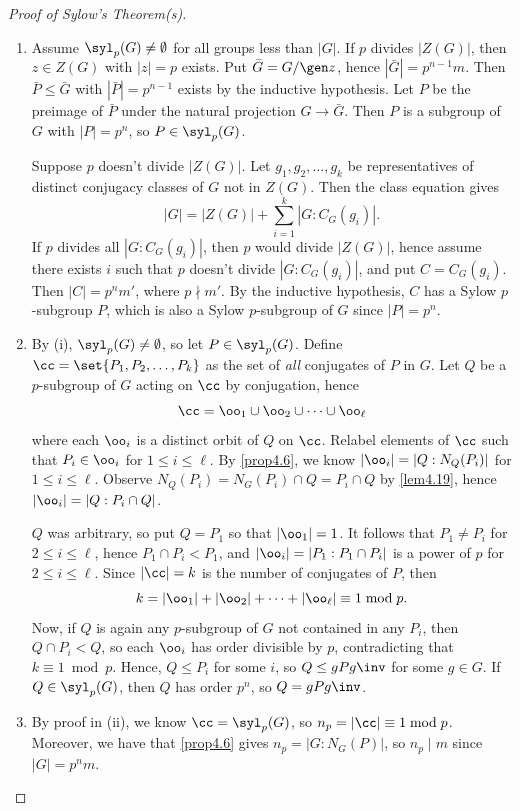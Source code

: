 \begin{proof}[Proof of Sylow's Theorem(s)]
    \leavevmode
    \begin{enumerate}
        \item Assume $\smash{\syl_p(G)} \neq \emptyset$ for all groups less than $|G|$. If $p$ divides $|Z(G)|$, then $z \in Z(G)$ with $|z| = p$ exists. Put $\bar G = G/\gen z$, hence $|\bar G| = p^{n - 1}m$. Then $\bar P \leq \bar G$ with $|\bar P| = p^{n - 1}$ exists by the inductive hypothesis. Let $P$ be the preimage of $\bar P$ under the natural projection $G \to \bar G$. Then $P$ is a subgroup of $G$ with $|P| = p^n$, so $P \in \syl_p(G)$.
        
        Suppose $p$ doesn't divide $|Z(G)|$. Let $g_1, g_2, \ldots, g_k$ be representatives of distinct conjugacy classes of $G$ not in $Z(G)$. Then the class equation gives
        \[|G| = |Z(G)| + \sum_{i = 1}^k |G : C_G(g_i)|.\]
        If $p$ divides all $|G : C_G(g_i)|$, then $p$ would divide $|Z(G)|$, hence assume there exists $i$ such that $p$ doesn't divide $|G : C_G(g_i)|$, and put $C = C_G(g_i)$. Then $|C| = p^nm'$, where $p \nmid m'$. By the inductive hypothesis, $C$ has a Sylow $p$-subgroup $P$, which is also a Sylow $p$-subgroup of $G$ since $|P| = p^n$.
        \item By (i), $\syl_p(G) \neq \emptyset$, so let $P \in \syl_p(G)$. Define $\cc = \set{P_1, P_2, \ldots, P_k}$ as the set of \textit{all} conjugates of $P$ in $G$. Let $Q$ be a $p$-subgroup of $G$ acting on $\cc$ by conjugation, hence
        \[\cc = \oo_1 \cup \oo_2 \cup \cdots \cup \oo_\ell\]
        where each $\oo_i$ is a distinct orbit of $Q$ on $\cc$. Relabel elements of $\cc$ such that $P_i \in \oo_i$ for $1 \leq i \leq \ell$. By \autoref{prop4.6}, we know $|\oo_i| = |Q : N_Q(P_i)|$ for $1 \leq i \leq \ell$. Observe $N_Q(P_i) = N_G(P_i) \cap Q = P_i \cap Q$ by \autoref{lem4.19}, hence $|\oo_i| = |Q : P_i \cap Q|$.

        $Q$ was arbitrary, so put $Q = P_1$ so that $|\oo_1| = 1$. It follows that $P_1 \neq P_i$ for $2 \leq i \leq \ell$, hence $P_1 \cap P_i < P_1$, and $|\oo_i| = |P_1 : P_1 \cap P_i|$ is a power of $p$ for $2 \leq i \leq \ell$. Since $|\cc| = k$ is the number of conjugates of $P$, then
        \[k = |\oo_1| + |\oo_2| + \cdots + |\oo_\ell| \equiv 1 \bmod p.\]
        Now, if $Q$ is again any $p$-subgroup of $G$ not contained in any $P_i$, then $Q \cap P_i < Q$, so each $\oo_i$ has order divisible by $p$, contradicting that $k \equiv 1 \bmod p$. Hence, $Q \leq P_i$ for some $i$, so $Q \leq gPg\inv$ for some $g \in G$. If $Q \in \syl_p(G)$, then $Q$ has order $p^n$, so $Q = gPg\inv$.
        \item By proof in (ii), we know $\cc = \syl_p(G)$, so $n_p = |\cc| \equiv 1 \bmod p$. Moreover, we have that \autoref{prop4.6} gives $n_p = |G : N_G(P)|$, so $n_p \mid m$ since $|G| = p^nm$. \qh
    \end{enumerate}
\end{proof}

